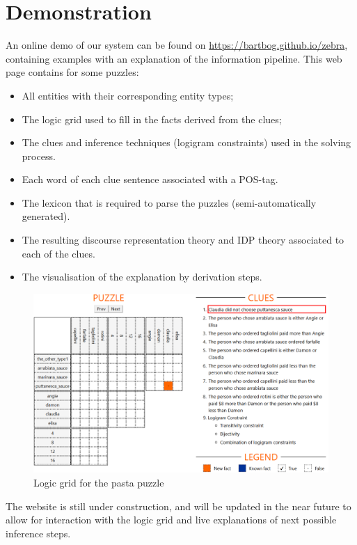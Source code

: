 \documentclass{article}
\begin{document}
\section{Demonstration}
An online demo of our system can be found on \url{https://bartbog.github.io/zebra}, containing examples with an explanation of the information pipeline. This web page contains for some puzzles:
\begin{itemize}
    \item All entities with their corresponding entity types; 
    \item The logic grid used to fill in the facts derived from the clues;
    \item The clues and inference techniques (logigram constraints) used in the solving process.
    \item Each word of each clue sentence associated with a POS-tag.
    \item The lexicon that is required to parse the puzzles (semi-automatically generated).
    \item The resulting discourse representation theory and IDP theory associated to each of the clues.
    \item The visualisation of the explanation by derivation steps. 
\end{itemize}

\begin{figure}[H]
    \centering
    \includegraphics[width=\linewidth]{puzzle.png}
    \caption{Logic grid for the pasta puzzle}
    \label{fig:pasta_grid}
\end{figure}

The website is still under construction, and will be updated in the near future to allow for interaction with the logic grid and live explanations of next possible inference steps.
\clearpage


\end{document}
